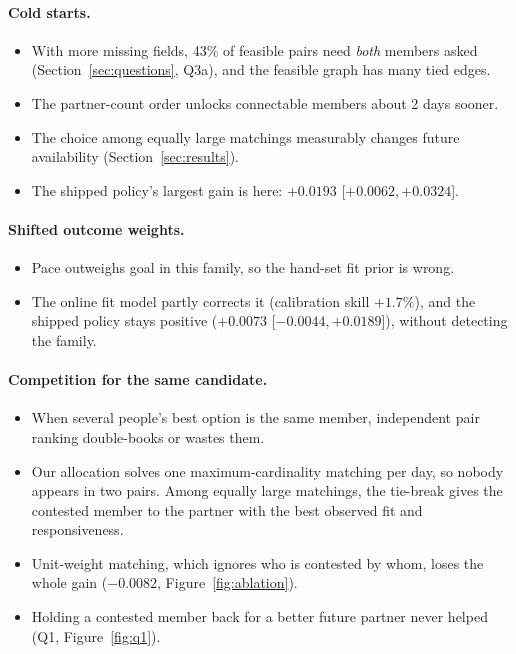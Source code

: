 \documentclass[10pt]{article}
\newcommand{\ci}[2]{[$#1$,\,$#2$]}
\begin{document}
\paragraph{Cold starts.}
\begin{itemize}
\item With more missing fields, 43\% of feasible pairs need \emph{both} members asked (Section~\ref{sec:questions}, Q3a), and the feasible graph has many tied edges.
\item The partner-count order unlocks connectable members about 2 days sooner.
\item The choice among equally large matchings measurably changes future availability (Section~\ref{sec:results}).
\item The shipped policy's largest gain is here: $+0.0193$ \ci{+0.0062}{+0.0324}.
\end{itemize}

\paragraph{Shifted outcome weights.}
\begin{itemize}
\item Pace outweighs goal in this family, so the hand-set fit prior is wrong.
\item The online fit model partly corrects it (calibration skill $+1.7\%$), and the shipped policy stays positive ($+0.0073$ \ci{-0.0044}{+0.0189}), without detecting the family.
\end{itemize}

\paragraph{Competition for the same candidate.}
\begin{itemize}
\item When several people's best option is the same member, independent pair ranking double-books or wastes them.
\item Our allocation solves one maximum-cardinality matching per day, so nobody appears in two pairs. Among equally large matchings, the tie-break gives the contested member to the partner with the best observed fit and responsiveness.
\item Unit-weight matching, which ignores who is contested by whom, loses the whole gain ($-0.0082$, Figure~\ref{fig:ablation}).
\item Holding a contested member back for a better future partner never helped (Q1, Figure~\ref{fig:q1}).
\end{itemize}
\end{document}
